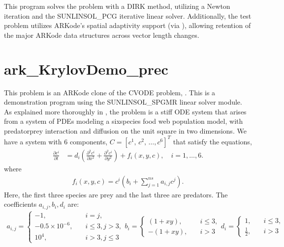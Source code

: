 \documentclass[letterpaper,10pt,english]{sphinxmanual}
\begin{document}
\sphinxAtStartPar
This program solves the problem with a DIRK method, utilizing a Newton
iteration and the SUNLINSOL\_PCG iterative linear solver.
Additionally, the test problem utilizes ARKode’s spatial adaptivity
support (via ), allowing retention of the
major ARKode data structures across vector length changes.


\section{ark\_KrylovDemo\_prec}
\label{\detokenize{c_serial:ark-krylovdemo-prec}}\label{\detokenize{c_serial:id30}}
\sphinxAtStartPar
This problem is an ARKode clone of the CVODE problem,
.  This is a demonstration program using the
SUNLINSOL\_SPGMR linear solver module.  As explained more thoroughly in
, the problem is a stiff ODE system that arises from a
system of PDEs modeling a six\sphinxhyphen{}species food web population model, with
predator\sphinxhyphen{}prey interaction and diffusion on the unit square in two
dimensions.  We have a system with 6 components, \(C = [c^1,\,
c^2,\,\ldots, c^6]^T\) that satisfy the equations,
\begin{equation*}
\begin{split}\frac{\partial c^i}{\partial t} &= d_i \left(\frac{\partial^2 c^i}{\partial
   x^2} + \frac{\partial^2 c^i}{\partial y^2}\right) +
   f_i(x,y,c),\quad i=1,\ldots,6.\end{split}
\end{equation*}
\sphinxAtStartPar
where
\begin{equation*}
\begin{split}f_i(x,y,c) = c^i\left( b_i + \sum_{j=1}^{ns} a_{i,j} c^j\right).\end{split}
\end{equation*}
\sphinxAtStartPar
Here, the first three species are prey and the last three are
predators.  The coefficients \(a_{i,j}, b_i, d_i\) are:
\begin{equation*}
\begin{split}a_{i,j} = \begin{cases}
            -1, \quad & i=j,\\
            -0.5\times10^{-6}, \quad & i\le 3, j>3, \\
             10^4, \quad & i>3, j\le3
          \end{cases}
b_i = \begin{cases}
         (1+xy), \quad & i\le 3,\\
        -(1+xy), \quad & i>3
      \end{cases}
d_i = \begin{cases}
         1, \quad & i\le 3,\\
         \frac12, \quad & i>3
      \end{cases}\end{split}
\end{equation*}
\end{document}

